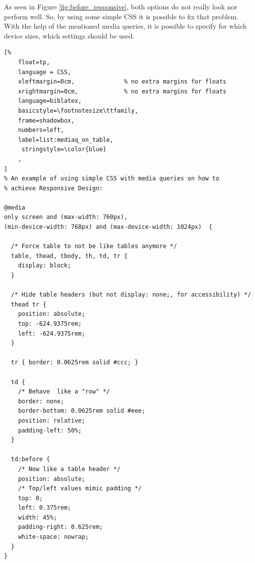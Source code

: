 As seen in Figure \ref{fig:before_responsive}, both options do not really look nor
perform well. So, by using some simple CSS it is possible to fix that
problem. With the help of the mentioned media queries, it is possible
to specify for which device sizes, which settings should be used.

\begin{lstlisting}[%
    float=tp,
    language = CSS,
    xleftmargin=0cm,              % no extra margins for floats
    xrightmargin=0cm,             % no extra margins for floats
    language=biblatex,
    basicstyle=\footnotesize\ttfamily,
    frame=shadowbox,
    numbers=left,
    label=list:mediaq_on_table,
     stringstyle=\color{blue}
    ,
]
% An example of using simple CSS with media queries on how to 
% achieve Responsive Design:

@media
only screen and (max-width: 760px),
(min-device-width: 768px) and (max-device-width: 1024px)  {

  /* Force table to not be like tables anymore */
  table, thead, tbody, th, td, tr {
    display: block;
  }

  /* Hide table headers (but not display: none;, for accessibility) */
  thead tr {
    position: absolute;
    top: -624.9375rem;
    left: -624.9375rem;
  }

  tr { border: 0.0625rem solid #ccc; }

  td {
    /* Behave  like a "row" */
    border: none;
    border-bottom: 0.0625rem solid #eee;
    position: relative;
    padding-left: 50%;
  }

  td:before {
    /* Now like a table header */
    position: absolute;
    /* Top/left values mimic padding */
    top: 0;
    left: 0.375rem;
    width: 45%;
    padding-right: 0.625rem;
    white-space: nowrap;
  }
}
\end{lstlisting}

